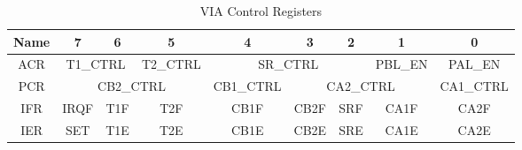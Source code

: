 \begin{table}[ht]
    \begin{center}
        \begin{tabular}{|c|c|c|c|c|c|c|c|c|} \hline
            Name & 7 & 6 & 5 & 4 & 3 & 2 & 1 & 0 \\\hline\hline
            ACR & \multicolumn{2}{|c|}{T1\_CTRL} & T2\_CTRL & \multicolumn{3}{|c|}{SR\_CTRL} & PBL\_EN & PAL\_EN \\\hline
            PCR & \multicolumn{3}{|c|}{CB2\_CTRL} & CB1\_CTRL & \multicolumn{3}{|c|}{CA2\_CTRL} & CA1\_CTRL \\\hline
            IFR & IRQF & T1F & T2F & CB1F & CB2F & SRF & CA1F & CA2F \\\hline
            IER & SET & T1E & T2E & CB1E & CB2E & SRE & CA1E & CA2E \\\hline
        \end{tabular}
    \end{center}
    \caption{VIA Control Registers}
    \label{tab:via_ctrl_reg}
\end{table}

